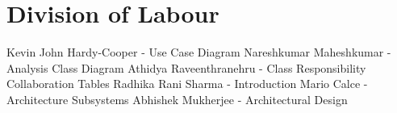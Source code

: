 \documentclass[]{article}
\begin{document}





\section{Division of Labour}
Kevin John Hardy-Cooper - Use Case Diagram 
\newline Nareshkumar Maheshkumar - Analysis Class Diagram
\newline Athidya Raveenthranehru - Class Responsibility Collaboration Tables
\newline Radhika Rani Sharma - Introduction
\newline Mario Calce - Architecture Subsystems
\newline Abhishek Mukherjee - Architectural Design 

\end{document}
